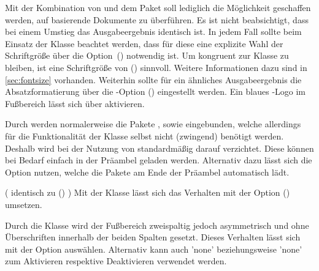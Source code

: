 \begin{Bundle*}{}
Mit der Kombination von  und dem Paket 
soll lediglich die Möglichkeit geschaffen werden, auf  
basierende Dokumente zu überführen. Es ist nicht beabsichtigt, dass bei einem 
Umstieg das Ausgabeergebnis identisch ist. In jedem Fall sollte beim Einsatz 
der Klasse  beachtet werden, dass für diese eine explizite 
Wahl der Schriftgröße über die Option~() 
notwendig ist. Um kongruent zur Klasse  zu bleiben, ist 
eine Schriftgröße von () 
sinnvoll. Weitere Informationen dazu sind in \autoref{sec:fontsize} vorhanden. 
Weiterhin sollte für ein ähnliches Ausgabeergebnis die Absatzformatierung über 
die \KOMAScript-Option () 
eingestellt werden. Ein blaues \DDC-Logo im Fußbereich lässt sich über 
 aktivieren.

\begin{Declaration}{}
\printdeclarationlist%
%
Durch  werden normalerweise die Pakete , 
 sowie  eingebunden, welche allerdings für 
die Funktionalität der Klasse selbst nicht (zwingend) benötigt werden. Deshalb 
wird bei der Nutzung von  standardmäßig darauf verzichtet. 
Diese können bei Bedarf einfach in der Präambel geladen werden. Alternativ 
dazu 
lässt sich die Option  nutzen, welche die Pakete am Ende 
der Präambel automatisch lädt.
\end{Declaration}

\begin{Declaration}{}(%
  identisch zu ()%
)
\printdeclarationlist%
%
Mit der Klasse  lässt sich das Verhalten mit der Option 
() umsetzen.
\end{Declaration}

\begin{Declaration}{}%
\printdeclarationlist%
%
Durch die Klasse  wird der Fußbereich zweispaltig jedoch 
asymmetrisch und ohne Überschriften innerhalb der beiden Spalten gesetzt. 
Dieses Verhalten lässt sich mit der Option  auswählen. 
Alternativ kann auch 'none' beziehungsweise 
'none' zum Aktivieren respektive Deaktivieren 
verwendet werden.
\end{Declaration}


\end{Bundle*}
